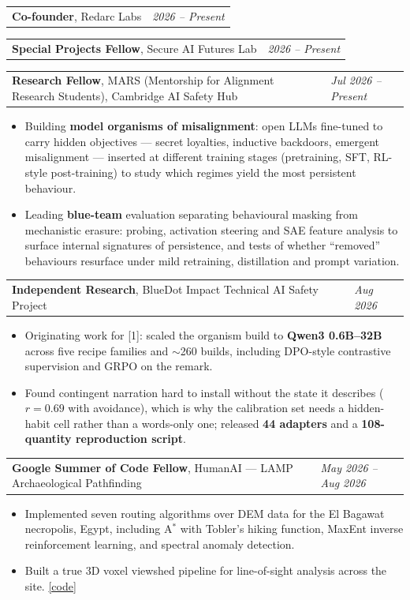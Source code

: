 \documentclass[letterpaper,10pt]{article}
\makeatletter
\newcommand{\codelink}[1]{\href{#1}{[code]}}
\newcommand{\cventry}[2]{%
    \begin{tabularx}{\textwidth}{@{}>{\raggedright\arraybackslash}X@{\hspace{8pt}}>{\raggedleft\arraybackslash}p{1.75in}@{}}
      #1 & \textit{\small #2}
    \end{tabularx}
}
\makeatother
\begin{document}
\cventry{\textbf{Co-founder}, Redarc Labs}{2026 -- Present}
\vspace{3pt}
\cventry{\textbf{Special Projects Fellow}, Secure AI Futures Lab}{2026 -- Present}
\vspace{3pt}
\cventry{\textbf{Research Fellow}, MARS (Mentorship for Alignment Research Students), Cambridge AI Safety Hub}{Jul 2026 -- Present}
\begin{itemize}[leftmargin=0.2in, itemsep=1pt, topsep=2pt, parsep=0pt]
  \item \small Building \textbf{model organisms of misalignment}: open LLMs fine-tuned to carry hidden objectives --- secret loyalties, inductive backdoors, emergent misalignment --- inserted at different training stages (pretraining, SFT, RL-style post-training) to study which regimes yield the most persistent behaviour.
  \item \small Leading \textbf{blue-team} evaluation separating behavioural masking from mechanistic erasure: probing, activation steering and SAE feature analysis to surface internal signatures of persistence, and tests of whether ``removed'' behaviours resurface under mild retraining, distillation and prompt variation.
\end{itemize}

\vspace{3pt}
\cventry{\textbf{Independent Research}, BlueDot Impact Technical AI Safety Project}{Aug 2026}
\begin{itemize}[leftmargin=0.2in, itemsep=1pt, topsep=2pt, parsep=0pt]
  \item \small Originating work for [1]: scaled the organism build to \textbf{Qwen3 0.6B--32B} across five recipe families and $\sim$260 builds, including DPO-style contrastive supervision and GRPO on the remark.
  \item \small Found contingent narration hard to install without the state it describes ($r = 0.69$ with avoidance), which is why the calibration set needs a hidden-habit cell rather than a words-only one; released \textbf{44 adapters} and a \textbf{108-quantity reproduction script}.
\end{itemize}

\vspace{3pt}
\cventry{\textbf{Google Summer of Code Fellow}, HumanAI --- LAMP Archaeological Pathfinding}{May 2026 -- Aug 2026}
\begin{itemize}[leftmargin=0.2in, itemsep=1pt, topsep=2pt, parsep=0pt]
  \item \small Implemented seven routing algorithms over DEM data for the El Bagawat necropolis, Egypt, including A$^{*}$ with Tobler's hiking function, MaxEnt inverse reinforcement learning, and spectral anomaly detection.
  \item \small Built a true 3D voxel viewshed pipeline for line-of-sight analysis across the site. \codelink{https://github.com/Manan-Wadhwa/elbagawat_path_finding}
\end{itemize}
\end{document}
